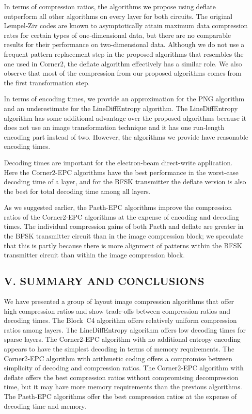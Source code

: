 \documentclass{article}
\begin{document}
In terms of compression ratios, the algorithms we propose using deflate
outperform all other algorithms on every layer for both circuits.
The original Lempel-Ziv codes are known to 
asymptotically attain maximum data
compression rates for certain types of one-dimensional data, but there are
no comparable results for their performance on two-dimensional data.
Although we do not use a frequent pattern replacement step in the proposed
algorithms that resembles the one used in Corner2, the deflate algorithm
effectively has a similar role.  We also observe that most of the compression
from our proposed algorithms comes from the first transformation step.

In terms of encoding times, we provide an approximation for the PNG algorithm
and an underestimate for the LineDiffEntropy algorithm.  
The LineDiffEntropy algorithm has some
additional advantage over the proposed algorithms because it does not use
an image transformation technique and it has one run-length encoding part
instead of two.  However, the algorithms we provide have reasonable
encoding times.

Decoding times are important for the electron-beam direct-write application.
Here the Corner2-EPC algorithms have the best performance in the worst-case
decoding time of a layer, and for the BFSK transmitter the deflate version
is also the best for total decoding time among all layers.

As we suggested earlier, the Paeth-EPC algorithms improve the compression
ratios of the Corner2-EPC algorithms at the expense of encoding and decoding
times.  The individual compression gains of both Paeth and deflate are 
greater in the BFSK transmitter circuit than in the image compression block;
we speculate that this is partly because there is more alignment of patterns 
within the BFSK transmitter circuit than within the image compression block.


\subsection*{V. SUMMARY AND CONCLUSIONS}
We have presented a group of layout image compression algorithms that offer
high compression ratios and show trade-offs between compression ratios
and decoding times.  The Block~C4 algorithm offers relatively uniform
compression ratios among layers.  The LineDiffEntropy algorithm offers
low decoding times for sparse layers.  The Corner2-EPC algorithm with no
additional entropy encoding appears to have the simplest decoding in terms
of memory requirements.  The Corner2-EPC algorithm with arithmetic coding
offers a compromise between simplicity of decoding and compression ratios.
The Corner2-EPC algorithm with deflate offers the best compression ratios
without compromising decompression time, but it may have more memory 
requirements than the previous algorithms.  The Paeth-EPC algorithms offer
the best compression ratios at the expense of decoding time and memory.
\end{document}
